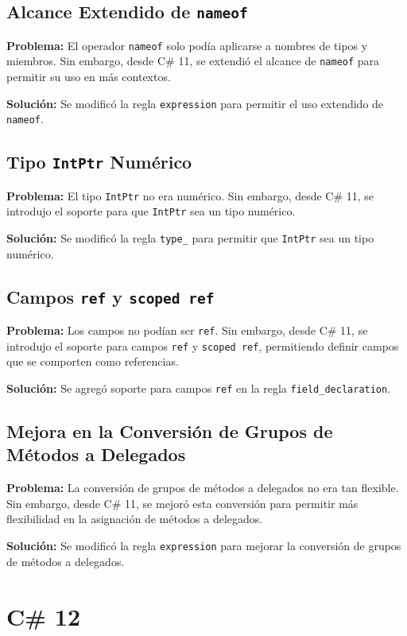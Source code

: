 \subsection*{Alcance Extendido de \texttt{nameof}}

\textbf{Problema:} El operador \texttt{nameof} solo podía aplicarse a nombres de tipos y miembros. Sin embargo, desde C\# 11, se extendió el alcance de \texttt{nameof} para permitir su uso en más contextos.

\textbf{Solución:} Se modificó la regla \texttt{expression} para permitir el uso extendido de \texttt{nameof}.

\subsection*{Tipo \texttt{IntPtr} Numérico}

\textbf{Problema:} El tipo \texttt{IntPtr} no era numérico. Sin embargo, desde C\# 11, se introdujo el soporte para que \texttt{IntPtr} sea un tipo numérico.

\textbf{Solución:} Se modificó la regla \texttt{type\_} para permitir que \texttt{IntPtr} sea un tipo numérico.

\subsection*{Campos \texttt{ref} y \texttt{scoped ref}}

\textbf{Problema:} Los campos no podían ser \texttt{ref}. Sin embargo, desde C\# 11, se introdujo el soporte para campos \texttt{ref} y \texttt{scoped ref}, permitiendo definir campos que se comporten como referencias.

\textbf{Solución:} Se agregó soporte para campos \texttt{ref} en la regla \texttt{field\_declaration}.

\subsection*{Mejora en la Conversión de Grupos de Métodos a Delegados}

\textbf{Problema:} La conversión de grupos de métodos a delegados no era tan flexible. Sin embargo, desde C\# 11, se mejoró esta conversión para permitir más flexibilidad en la asignación de métodos a delegados.

\textbf{Solución:} Se modificó la regla \texttt{expression} para mejorar la conversión de grupos de métodos a delegados.

\section{C\# 12}

